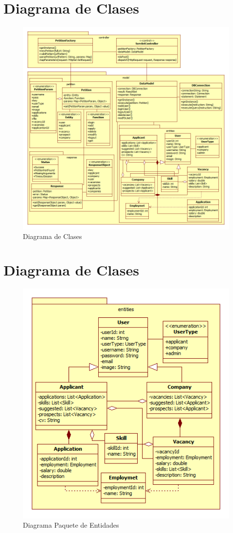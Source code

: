 \newpage
\section{Diagrama de Clases}

\begin{figure}[h]
\begin{center}
	\includegraphics[scale=0.73]{./resources/ClassDiagram.png}
	\caption{Diagrama de Clases}
	\label{fig:classdiagram}
\end{center}
\end{figure}


\newpage
\section{Diagrama de Clases}

\begin{figure}[h]
\begin{center}
	\includegraphics[scale=1.2]{./resources/EntitiesPackage.png}
	\caption{Diagrama Paquete de Entidades}
	\label{fig:classdiagram}
\end{center}
\end{figure}